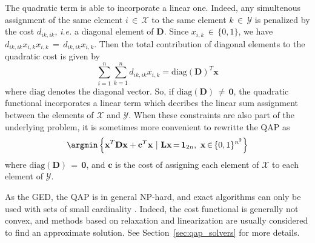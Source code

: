 The quadratic term is able to incorporate a linear one. Indeed, any simultenous assignment of the same element $i\,{\in}\,\mathcal{X}$ to the same element $k\,{\in}\,\mathcal{Y}$ is penalized by the cost $d_{ik,ik}$, \textit{i.e.} a diagonal element of $\mathbf{D}$. Since $x_{i,k}\,{\in}\,\{0,1\}$, we have $d_{ik,ik}x_{i,k}x_{i,k}\,{=}\,d_{ik,ik}x_{i,k}$. Then the total contribution of diagonal elements to the quadratic cost is given by
\begin{equation*}
	\sum_{i=1}^n\sum_{k=1}^n d_{ik,ik}x_{i,k}=\text{diag}(\mathbf{D})^T\mathbf{x}
\end{equation*}
where $\text{diag}$ denotes the diagonal vector. So, if $\text{diag}(\mathbf{D})\,{\not=}\,\mathbf{0}$, the quadratic functional incorporates a linear term which decribes the linear sum assignment between the elements of $\mathcal{X}$ and $\mathcal{Y}$. When these constraints are also part of the underlying problem, it is sometimes more convenient to rewritte the QAP as
\begin{equation}\label{eq:matrix_form}
\argmin\left\{\mathbf{x}^T\mathbf{D}\mathbf{x} + \mathbf{c}^T\mathbf{x}~|~\mathbf{L}\mathbf{x}\,{=}\,\mathbf{1}_{2n},~\mathbf{x}\,{\in}\,\{0,1\}^{n^2}\right\}
\end{equation}
where $\text{diag}(\mathbf{D})\,{=}\,\mathbf{0}$, and $\mathbf{c}$ is the cost of assigning each element of $\mathcal{X}$ to each element of $\mathcal{Y}$.

As the GED, the QAP is in general NP-hard, and exact algorithms can only be used with sets of small cardinality \cite{bur09}. Indeed, the cost functional is generally not convex, and methods based on relaxation and linearization are usually considered to find an approximate solution. See Section~\ref{sec:qap_solvers} for more details.
